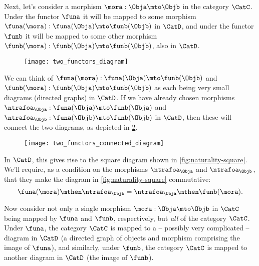 Next, let's consider a morphism $\mora : \Obja \mto \Objb$ in the category $\CatC$.
Under the functor $\funa$ it will be mapped to some morphism $\funa(\mora): \funa(\Obja) \mto \funb(\Objb)$ in $\CatD$, and under the functor $\funb$ it will be mapped to some other morphism $\funb(\mora): \funb(\Obja) \mto \funb(\Objb)$, also in $\CatD$.

%
\begin{figure}[h!]
    \texttt{[image: two\_functors\_diagram]}
    \caption{}
    \label{fig:two-functors-diagram}
\end{figure}
%

We can think of $\funa(\mora): \funa(\Obja) \mto \funb(\Objb)$ and $\funb(\mora): \funb(\Obja) \mto \funb(\Objb)$ as each being very small diagrams (directed graphs) in $\CatD$.
If we have already chosen morphisms $\ntrafoa_\Obja: \funa(\Obja) \mto \funb(\Obja)$ and $\ntrafoa_\Objb: \funa(\Objb) \mto \funb(\Objb)$ in $\CatD$, then these will connect the two diagrams, as depicted in \cref{fig:two-functors-connected-diagram}.

%
\begin{figure}[h!]
    \texttt{[image: two\_functors\_connected\_diagram]}
    \caption{}
    \label{fig:two-functors-connected-diagram}
\end{figure}
%

In $\CatD$, this gives rise to the square diagram shown in \cref{fig:naturality-square}.
We'll require, as a condition on the morphisms $\ntrafoa_\Obja$ and $\ntrafoa_\Objb$, that they make the diagram in \cref{fig:naturality-square} commutative:
\begin{equation}
    \funa(\mora) \mthen \ntrafoa_\Objb = \ntrafoa_\Obja \mthen \funb(\mora).
\end{equation}

%
\begin{marginfigure}
    \centering
    \caption{}
    \label{fig:naturality-square}
\end{marginfigure}
%

Now consider not only a single morphism $\mora : \Obja \mto \Objb$ in $\CatC$ being mapped by $\funa$ and $\funb$, respectively, but \emph{all} of the category $\CatC$.
Under $\funa$, the category $\CatC$ is mapped to a -- possibly very complicated --  diagram in $\CatD$ (a directed graph of objects and morphism comprising the image of $\funa$), and similarly, under $\funb$, the category $\CatC$ is mapped to another diagram in $\CatD$ (the image of $\funb$).

